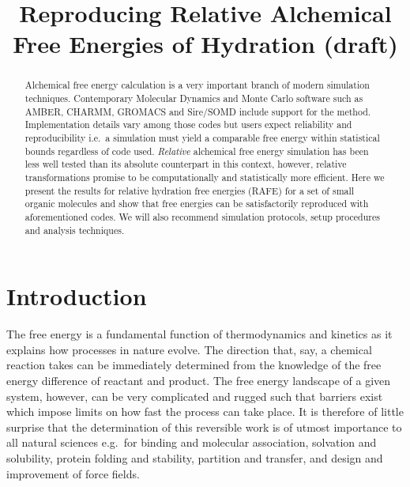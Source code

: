\documentclass[journal=jctcce,manuscript=article]{achemso}
\title{Reproducing Relative Alchemical Free Energies of Hydration
  (draft)}
\begin{document}
\begin{abstract}
  Alchemical free energy calculation is a very important branch of
  modern simulation techniques.  Contemporary Molecular Dynamics and
  Monte Carlo software such as AMBER, CHARMM, GROMACS and Sire/SOMD
  include support for the method.  Implementation details vary among
  those codes but users expect reliability and reproducibility i.e.\ a
  simulation must yield a comparable free energy within statistical
  bounds regardless of code used.  \emph{Relative} alchemical free
  energy simulation has been less well tested than its absolute
  counterpart in this context, however, relative transformations
  promise to be computationally and statistically more efficient.
  Here we present the results for relative hydration free energies
  (RAFE) for a set of small organic molecules and show that free
  energies can be satisfactorily reproduced with aforementioned codes.
  We will also recommend simulation protocols, setup procedures and
  analysis techniques.
\end{abstract}

\begin{tocentry}
\end{tocentry}




\section{Introduction}
\label{sec:intro}

The free energy is a fundamental function of thermodynamics and
kinetics as it explains how processes in nature evolve.  The direction
that, say, a chemical reaction takes can be immediately determined
from the knowledge of the free energy difference of reactant and
product.  The free energy landscape of a given system, however, can be
very complicated and rugged such that barriers exist which impose
limits on how fast the process can take place.  It is therefore of
little surprise that the determination of this reversible work is of
utmost importance to all natural sciences e.g.\ for binding and
molecular association, solvation and solubility, protein folding and
stability, partition and transfer, and design and improvement of force
fields.
\end{document}

